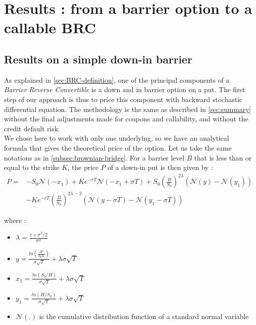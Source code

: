 \documentclass[a4paper,11pt,english]{book}
\begin{document}

\chapter{Results : from a barrier option to a callable BRC}

\section{Results on a simple down-in barrier}
As explained in \ref{sec:BRC-definition}, one of the principal components of a \textit{Barrier Reverse Convertible} is a down and in barrier option on a put. The first step of our approach is thus to price this component with backward stochastic differential equation. The methodology is the same as described in \ref{sec:summary} without the final adjustments made for coupons and callability, and without the credit default risk.\\

We chose here to work with only one underlying, so we have an analytical formula that gives the theoretical price of the option. Let us take the same notations as in \ref{subsec:brownian-bridge}. For a barrier level $B$ that is less than or equal to the strike $K$, the price $P$ of a down-in put is then given by \cite{hull2016options}: 
$$\begin{align}
P =& -S_{0}\mathcal{N}(-x_{1})+Ke^{-rT}\mathcal{N}(-x_{1}+\sigma T)+S_{0}(\frac{B}{S_{0}})^{2\lambda}(\mathcal{N}(y)-\mathcal{N}(y_{1})) \\
&-Ke^{-rT}(\frac{B}{S_{0}})^{2\lambda-2}(\mathcal{N}(y-\sigma T)-\mathcal{N}(y_{1}-\sigma T))
\end{align}$$

where :
\begin{itemize}
    \item $\lambda=\frac{r+\sigma^{2}/2}{\sigma^{2}}$
    \item $y=\frac{ln(\frac{B^{2}}{S_{0}K})}{\sigma \sqrt{T}}+\lambda \sigma \sqrt{T}$
    \item $x_{1}=\frac{ln(S_{0}/H)}{\sigma \sqrt{T}}+\lambda \sigma \sqrt{T}$
    \item $y_{1}=\frac{ln(H/S_{0})}{\sigma \sqrt{T}}+\lambda \sigma \sqrt{T}$
    \item $\mathcal{N}(.)$ is the cumulative distribution function of a standard normal variable
\end{itemize}
\end{document}

